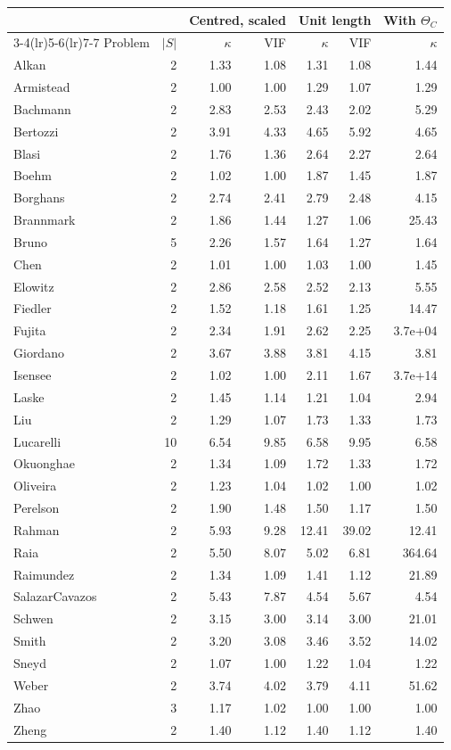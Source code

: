 \begin{tabular}{@{}lrrrrrr@{}}
\toprule
 & & \multicolumn{2}{c}{Centred, scaled} & \multicolumn{2}{c}{Unit length} & With $\Theta_C$ \\
\cmidrule(lr){3-4}\cmidrule(lr){5-6}\cmidrule(lr){7-7}
Problem & $|S|$ & $\kappa$ & VIF & $\kappa$ & VIF & $\kappa$ \\
\midrule
Alkan & 2 & 1.33 & 1.08 & 1.31 & 1.08 & 1.44 \\
Armistead & 2 & 1.00 & 1.00 & 1.29 & 1.07 & 1.29 \\
Bachmann & 2 & 2.83 & 2.53 & 2.43 & 2.02 & 5.29 \\
Bertozzi & 2 & 3.91 & 4.33 & 4.65 & 5.92 & 4.65 \\
Blasi & 2 & 1.76 & 1.36 & 2.64 & 2.27 & 2.64 \\
Boehm & 2 & 1.02 & 1.00 & 1.87 & 1.45 & 1.87 \\
Borghans & 2 & 2.74 & 2.41 & 2.79 & 2.48 & 4.15 \\
Brannmark & 2 & 1.86 & 1.44 & 1.27 & 1.06 & 25.43 \\
Bruno & 5 & 2.26 & 1.57 & 1.64 & 1.27 & 1.64 \\
Chen & 2 & 1.01 & 1.00 & 1.03 & 1.00 & 1.45 \\
Elowitz & 2 & 2.86 & 2.58 & 2.52 & 2.13 & 5.55 \\
Fiedler & 2 & 1.52 & 1.18 & 1.61 & 1.25 & 14.47 \\
Fujita & 2 & 2.34 & 1.91 & 2.62 & 2.25 & 3.7e+04 \\
Giordano & 2 & 3.67 & 3.88 & 3.81 & 4.15 & 3.81 \\
Isensee & 2 & 1.02 & 1.00 & 2.11 & 1.67 & 3.7e+14 \\
Laske & 2 & 1.45 & 1.14 & 1.21 & 1.04 & 2.94 \\
Liu & 2 & 1.29 & 1.07 & 1.73 & 1.33 & 1.73 \\
Lucarelli & 10 & 6.54 & 9.85 & 6.58 & 9.95 & 6.58 \\
Okuonghae & 2 & 1.34 & 1.09 & 1.72 & 1.33 & 1.72 \\
Oliveira & 2 & 1.23 & 1.04 & 1.02 & 1.00 & 1.02 \\
Perelson & 2 & 1.90 & 1.48 & 1.50 & 1.17 & 1.50 \\
Rahman & 2 & 5.93 & 9.28 & 12.41 & 39.02 & 12.41 \\
Raia & 2 & 5.50 & 8.07 & 5.02 & 6.81 & 364.64 \\
Raimundez & 2 & 1.34 & 1.09 & 1.41 & 1.12 & 21.89 \\
SalazarCavazos & 2 & 5.43 & 7.87 & 4.54 & 5.67 & 4.54 \\
Schwen & 2 & 3.15 & 3.00 & 3.14 & 3.00 & 21.01 \\
Smith & 2 & 3.20 & 3.08 & 3.46 & 3.52 & 14.02 \\
Sneyd & 2 & 1.07 & 1.00 & 1.22 & 1.04 & 1.22 \\
Weber & 2 & 3.74 & 4.02 & 3.79 & 4.11 & 51.62 \\
Zhao & 3 & 1.17 & 1.02 & 1.00 & 1.00 & 1.00 \\
Zheng & 2 & 1.40 & 1.12 & 1.40 & 1.12 & 1.40 \\
\bottomrule
\end{tabular}
